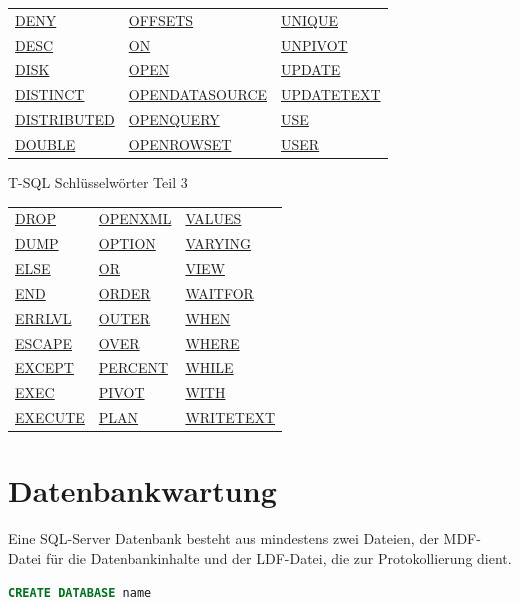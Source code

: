 \documentclass[12pt,ngerman,a4paper,index=totoc,twoside]{scrartcl}
\newcommand{\indexlink}[1]{\index{#1\protect\hypertarget{#1}{}}\hyperlink{#1}{#1}}
\newcommand{\sql}[1]{\texttt{#1}}
\begin{document}
\begin{center}
\begin{tabular}{p{5cm}p{5cm}p{5cm}}
\indexlink{DENY} & \indexlink{OFFSETS} & \indexlink{UNIQUE} \\ 
\indexlink{DESC} & \indexlink{ON} & \indexlink{UNPIVOT} \\ 
\indexlink{DISK} & \indexlink{OPEN} & \indexlink{UPDATE} \\ 
\indexlink{DISTINCT} & \indexlink{OPENDATASOURCE} & \indexlink{UPDATETEXT} \\ 
\indexlink{DISTRIBUTED} & \indexlink{OPENQUERY} & \indexlink{USE} \\ 
\indexlink{DOUBLE} & \indexlink{OPENROWSET} & \indexlink{USER} \\ 
\end{tabular}
\end{center}


\begin{center}
\captionsetup{type=table}
\caption{T-SQL Schlüsselwörter Teil 3}
\begin{tabular}{p{5cm}p{5cm}p{5cm}}  
\indexlink{DROP} & \indexlink{OPENXML} & \indexlink{VALUES} \\ 
\indexlink{DUMP} & \indexlink{OPTION} & \indexlink{VARYING} \\ 
\indexlink{ELSE} & \indexlink{OR} & \indexlink{VIEW} \\ 
\indexlink{END} & \indexlink{ORDER} & \indexlink{WAITFOR} \\ 
\indexlink{ERRLVL} & \indexlink{OUTER} & \indexlink{WHEN} \\ 
\indexlink{ESCAPE} & \indexlink{OVER} & \indexlink{WHERE} \\ 
\indexlink{EXCEPT} & \indexlink{PERCENT} & \indexlink{WHILE} \\ 
\indexlink{EXEC} & \indexlink{PIVOT} & \indexlink{WITH} \\ 
\indexlink{EXECUTE} & \indexlink{PLAN} & \indexlink{WRITETEXT} \\ 
\end{tabular}
\end{center}

\section{Datenbankwartung}

Eine SQL-Server Datenbank besteht aus mindestens zwei Dateien, der MDF-Datei für die Datenbankinhalte und der LDF-Datei, die zur Protokollierung dient. 

\begin{center}
\begin{minipage}{0.75\textwidth}
\begin{lstlisting}[language={SQL},caption={einfachste \sql{CREATE DATABASE} Abfrage},label={create1:create1}]
CREATE DATABASE name
\end{lstlisting}
\end{minipage}
\end{center}
\end{document}
